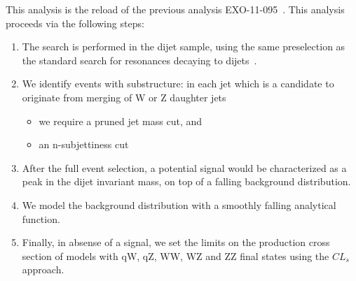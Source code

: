 This analysis is the reload of the previous analysis EXO-11-095~\cite{ref_2011}.  
This analysis proceeds via the following steps:
\begin{enumerate}
\item The search is performed in the dijet sample, using the same
      preselection as the standard search for resonances decaying to 
      dijets~\cite{cmsdijet}.

\item We identify events with substructure: in each jet which is a candidate
    to originate from merging of W or Z daughter jets
  \begin{itemize}
  \item we require a pruned jet mass cut, and
  \item an n-subjettiness cut
  \end{itemize}

\item After the full event selection, a potential signal would be characterized as
    a peak in the dijet invariant mass, on top of a falling background distribution.

\item We model the background distribution with a smoothly falling 
  analytical function.

\item Finally, in absense of a signal, we set the limits on the production cross section of
  models with qW, qZ, WW, WZ and ZZ final states using the $CL_s$ approach.

\end{enumerate}
